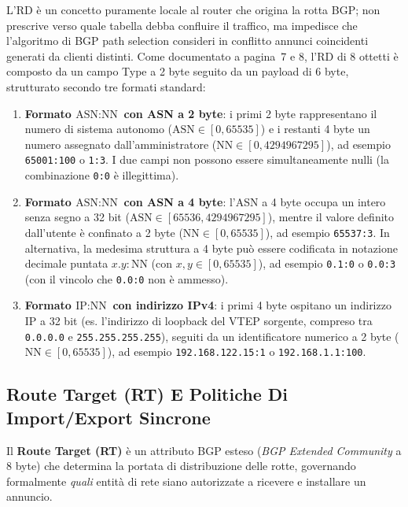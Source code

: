\documentclass[11pt, a4paper]{article}
\begin{document}
L'RD è un concetto puramente locale al router che origina la rotta BGP; non prescrive verso quale tabella debba confluire il traffico, ma impedisce che l'algoritmo di BGP path selection consideri in conflitto annunci coincidenti generati da clienti distinti. Come documentato a pagina~7 e 8, l'RD di 8 ottetti è composto da un campo Type a 2 byte seguito da un payload di 6 byte, strutturato secondo tre formati standard:
\begin{enumerate}
    \item \textbf{Formato $\text{ASN}:\text{NN}$ con ASN a 2 byte}: i primi 2 byte rappresentano il numero di sistema autonomo ($\text{ASN} \in [0, 65535]$) e i restanti 4 byte un numero assegnato dall'amministratore ($\text{NN} \in [0, 4294967295]$), ad esempio \texttt{65001:100} o \texttt{1:3}. I due campi non possono essere simultaneamente nulli (la combinazione \texttt{0:0} è illegittima).
    \item \textbf{Formato $\text{ASN}:\text{NN}$ con ASN a 4 byte}: l'ASN a 4 byte occupa un intero senza segno a 32 bit ($\text{ASN} \in [65536, 4294967295]$), mentre il valore definito dall'utente è confinato a 2 byte ($\text{NN} \in [0, 65535]$), ad esempio \texttt{65537:3}. In alternativa, la medesima struttura a 4 byte può essere codificata in notazione decimale puntata $x.y:\text{NN}$ (con $x, y \in [0, 65535]$), ad esempio \texttt{0.1:0} o \texttt{0.0:3} (con il vincolo che \texttt{0.0:0} non è ammesso).
    \item \textbf{Formato $\text{IP}:\text{NN}$ con indirizzo IPv4}: i primi 4 byte ospitano un indirizzo IP a 32 bit (es. l'indirizzo di loopback del VTEP sorgente, compreso tra \texttt{0.0.0.0} e \texttt{255.255.255.255}), seguiti da un identificatore numerico a 2 byte ($\text{NN} \in [0, 65535]$), ad esempio \texttt{192.168.122.15:1} o \texttt{192.168.1.1:100}.
\end{enumerate}

\subsection{Route Target (RT) E Politiche Di Import/Export Sincrone}

Il \textbf{Route Target (RT)} è un attributo BGP esteso (\emph{BGP Extended Community} a 8 byte) che determina la portata di distribuzione delle rotte, governando formalmente \emph{quali} entità di rete siano autorizzate a ricevere e installare un annuncio.

\end{document}
